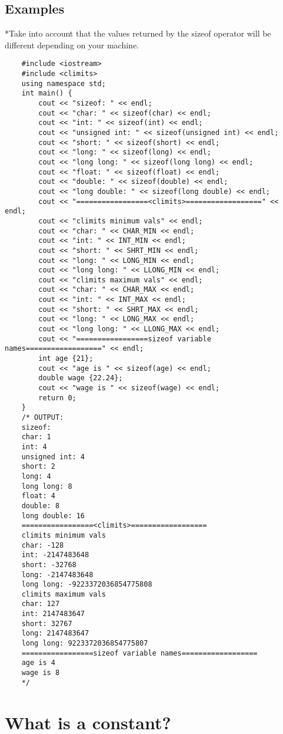 \subsection{Examples}
*Take into account that the values returned by the sizeof operator will be different depending on your machine.
\begin{verbatim}
    #include <iostream>
    #include <climits>
    using namespace std;
    int main() {
        cout << "sizeof: " << endl;
        cout << "char: " << sizeof(char) << endl;
        cout << "int: " << sizeof(int) << endl;
        cout << "unsigned int: " << sizeof(unsigned int) << endl;
        cout << "short: " << sizeof(short) << endl;
        cout << "long: " << sizeof(long) << endl;
        cout << "long long: " << sizeof(long long) << endl;
        cout << "float: " << sizeof(float) << endl;
        cout << "double: " << sizeof(double) << endl;
        cout << "long double: " << sizeof(long double) << endl;
        cout << "=================<climits>==================" << endl;
        cout << "climits minimum vals" << endl;
        cout << "char: " << CHAR_MIN << endl;
        cout << "int: " << INT_MIN << endl;
        cout << "short: " << SHRT_MIN << endl;
        cout << "long: " << LONG_MIN << endl;
        cout << "long long: " << LLONG_MIN << endl;
        cout << "climits maximum vals" << endl;
        cout << "char: " << CHAR_MAX << endl;
        cout << "int: " << INT_MAX << endl;
        cout << "short: " << SHRT_MAX << endl;
        cout << "long: " << LONG_MAX << endl;
        cout << "long long: " << LLONG_MAX << endl;
        cout << "=================sizeof variable names==================" << endl;
        int age {21};
        cout << "age is " << sizeof(age) << endl;
        double wage {22.24};
        cout << "wage is " << sizeof(wage) << endl;
        return 0;
    }
    /* OUTPUT: 
    sizeof: 
    char: 1 
    int: 4
    unsigned int: 4
    short: 2
    long: 4
    long long: 8
    float: 4
    double: 8
    long double: 16
    =================<climits>==================
    climits minimum vals
    char: -128
    int: -2147483648
    short: -32768
    long: -2147483648
    long long: -9223372036854775808
    climits maximum vals
    char: 127
    int: 2147483647
    short: 32767
    long: 2147483647
    long long: 9223372036854775807
    =================sizeof variable names==================
    age is 4
    wage is 8
    */
\end{verbatim}


\section{What is a constant?}
